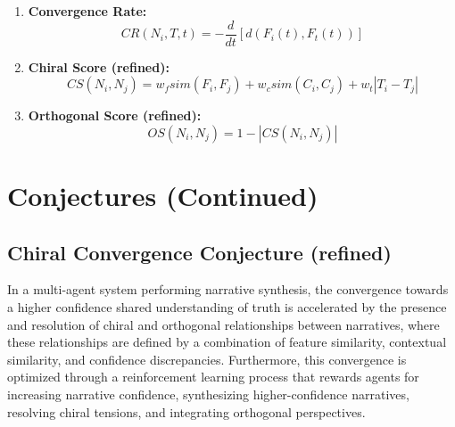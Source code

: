 \documentclass{article}
\begin{document}
\begin{enumerate}
    \item \textbf{Convergence Rate:}
    \[
    CR(N_i, T, t) = -\frac{d}{dt} [d(F_i(t), F_t(t))]
    \]
    \item \textbf{Chiral Score (refined): }
    \[
    CS(N_i, N_j) = w_f sim(F_i, F_j) + w_c sim(C_i, C_j) + w_t |T_i - T_j|
    \]
    \item \textbf{Orthogonal Score (refined): }
    \[
    OS(N_i, N_j) = 1 - |CS(N_i, N_j)|
    \]
\end{enumerate}


\section{Conjectures (Continued)}

\subsection{Chiral Convergence Conjecture (refined)}

In a multi-agent system performing narrative synthesis, the convergence towards a higher confidence shared understanding of truth is accelerated by the presence and resolution of chiral and orthogonal relationships between narratives, where these relationships are defined by a combination of feature similarity, contextual similarity, and confidence discrepancies.  Furthermore, this convergence is optimized through a reinforcement learning process that rewards agents for increasing narrative confidence, synthesizing higher-confidence narratives, resolving chiral tensions, and integrating orthogonal perspectives.
\end{document}
